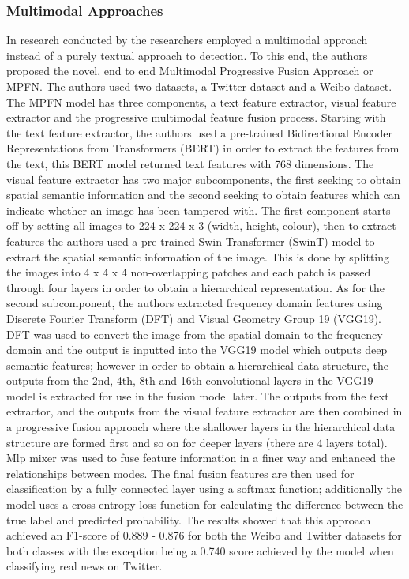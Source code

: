 \documentclass[stu,12pt,floatsintext,donotrepeattitle]{apa7}
\begin{document}
\subsubsection{Multimodal Approaches}
In research conducted by \textcite{multimodal} the researchers employed a multimodal approach instead of a purely textual approach to detection. To this end, the authors proposed the novel, end to end Multimodal Progressive Fusion Approach or MPFN. The authors used two datasets, a Twitter dataset and a Weibo dataset. The MPFN model has three components, a text feature extractor, visual feature extractor and the progressive multimodal feature fusion process. Starting with the text feature extractor, the authors used a pre-trained Bidirectional Encoder Representations from Transformers (BERT) in order to extract the features from the text, this BERT model returned text features with 768 dimensions. The visual feature extractor has two major subcomponents, the first seeking to obtain spatial semantic information and the second seeking to obtain features which can indicate whether an image has been tampered with. The first component starts off by setting all images to 224 x 224 x 3 (width, height, colour), then to extract features the authors used a pre-trained Swin Transformer (SwinT) model to extract the spatial semantic information of the image. This is done by splitting the images into 4 x 4 x 4 non-overlapping patches and each patch is passed through four layers in order to obtain a hierarchical representation. As for the second subcomponent, the authors extracted frequency domain features using Discrete Fourier Transform (DFT) and Visual Geometry Group 19 (VGG19). DFT was used to convert the image from the spatial domain to the frequency domain and the output is inputted into the VGG19 model which outputs deep semantic features; however in order to obtain a hierarchical data structure, the outputs from the 2nd, 4th, 8th and 16th convolutional layers in the VGG19 model is extracted for use in the fusion model later. The outputs from the text extractor, and the outputs from the visual feature extractor are then combined in a progressive fusion approach where the shallower layers in the hierarchical data structure are formed first and so on for deeper layers (there are 4 layers total). Mlp mixer was used to fuse feature information in a finer way and enhanced the relationships between modes. The final fusion features are then used for classification by a fully connected layer using a softmax function; additionally the model uses a cross-entropy loss function for calculating the difference between the true label and predicted probability. The results showed that this approach achieved an F1-score of 0.889 - 0.876 for both the Weibo and Twitter datasets for both classes with the exception being a 0.740 score achieved by the model when classifying real news on Twitter. 
\end{document}
